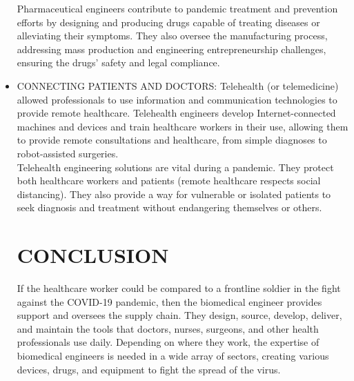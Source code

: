 \documentclass[12 pt]{report}
\begin{document}
\begin{itemize}
Pharmaceutical engineers contribute to pandemic treatment and prevention efforts by designing and producing drugs capable of treating diseases or alleviating their symptoms. They also oversee the manufacturing process, addressing mass production and engineering entrepreneurship challenges, ensuring the drugs’ safety and legal compliance.
\item CONNECTING PATIENTS AND DOCTORS: Telehealth (or telemedicine) allowed professionals to use information and communication technologies to provide remote healthcare. Telehealth engineers develop Internet-connected machines and devices and train healthcare workers in their use, allowing them to provide remote consultations and healthcare, from simple diagnoses to robot-assisted surgeries.\\

 

Telehealth engineering solutions are vital during a pandemic. They protect both healthcare workers and patients (remote healthcare respects social distancing). They also provide a way for vulnerable or isolated patients to seek diagnosis and treatment without endangering themselves or others.
\section{CONCLUSION}If the healthcare worker could be compared to a frontline soldier in the fight against the COVID-19 pandemic, then the biomedical engineer provides support and oversees the supply chain. They design, source, develop, deliver, and maintain the tools that doctors, nurses, surgeons, and other health professionals use daily. Depending on where they work, the expertise of biomedical engineers is needed in a wide array of sectors, creating various devices, drugs, and equipment to fight the spread of the virus.
\end{itemize} 
\end{document}
